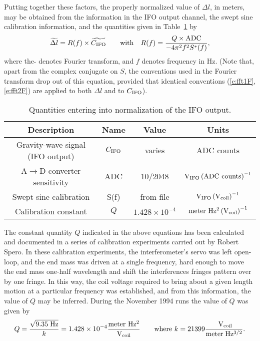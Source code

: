 Putting together these factors, the
properly normalized value of $\Delta l$, in meters, may be obtained
from the information in the IFO output channel, the swept sine calibration information, and the
quantities given in Table~\ref{t:unitsF} by
\begin{equation}
\label{e:rdefF}
\widetilde{\Delta  l} = R(f) \times \widetilde{C_{\rm IFO} }  \qquad {\rm with } \quad
R(f) = {Q  \times {\rm ADC}  \over -4 \pi^2 f^2 S^*(f)},
\end{equation}
where the $\tilde {}$ denotes Fourier transform, and $f$ denotes
frequency in Hz.  (Note that, apart from the complex conjugate on $S$,
the conventions used in the Fourier transform drop out of this
equation, provided that identical conventions
(\ref{e:fft1F},\ref{e:fft2F}) are applied to both $\Delta l$ and to
$C_{\rm IFO}$).
\begin{table}[h]
\caption{Quantities entering into normalization of the IFO output.}
\label{t:unitsF}
\begin{center}
\begin{tabular}[]{c|c|c|c}
Description            & Name      &  Value                & Units \\
\hline
Gravity-wave signal (IFO output)   & $C_{\rm IFO}$  &  varies               & ADC counts \\
\hline
A$\rightarrow$D converter sensitivity & ADC       &  10/2048              &    $ \rm V_{\rm IFO} \left({\rm ADC\ counts}\right)^{-1}      $ \\
\hline
Swept sine calibration & S(f)        &  from file            &  $   \rm V_{\rm IFO}  \left( V_{\rm coil}\right) ^{-1} $ \\
\hline
Calibration constant   &  $Q$      & $1.428\times 10^{-4}$ &  $ \rm meter\ Hz^2 \left(  V_{\rm coil} \right)^{-1} $
\end{tabular}
\end{center}
\end{table}
The constant quantity $Q$ indicated in the above equations has been
calculated and documented in a series of calibration experiments
carried out by Robert Spero. In these calibration experiments, the
interferometer's servo was left open-loop, and the end mass was driven
at a single frequency, hard enough to move the end mass one-half
wavelength and shift the interferences fringes pattern over by one
fringe.  In this way, the coil voltage required to bring about a given
length motion at a particular frequency was established, and
from this information, the value of $Q$ may be inferred.  During the
November 1994 runs the value of $Q$ was given by
\begin{equation}
Q = {\sqrt{9.35 \; \rm Hz} \over k} = 1.428 \times 10^{-4} {\rm
meter\ Hz^2 \over V_{\rm coil}} \qquad {\rm where\ } k=21399 {\rm
\ V_{\rm coil} \over meter \; Hz^{3/2}}.
\end{equation}

